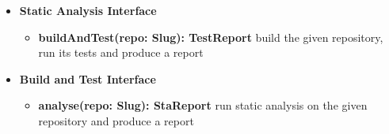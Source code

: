 \begin{itemize}
    \item \textbf{Static Analysis Interface}
          \begin{itemize}
              \item \textbf{buildAndTest(repo: Slug): TestReport}
                    build the given repository, run its tests and produce a report
          \end{itemize}
    \item \textbf{Build and Test Interface}
          \begin{itemize}
              \item \textbf{analyse(repo: Slug): StaReport}
                    run static analysis on the given repository and produce a report
          \end{itemize}
\end{itemize}

